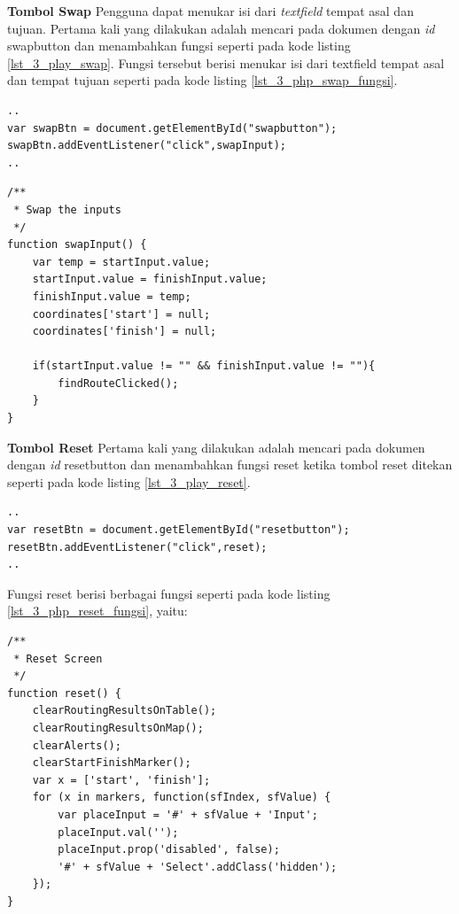 \documentclass[a4paper,twoside]{article}
\begin{document}
\begin{enumerate}
\textbf{Tombol Swap}
Pengguna dapat menukar isi dari \textit{textfield} tempat asal dan tujuan. Pertama kali yang dilakukan adalah mencari pada dokumen dengan \textit{id} swapbutton dan menambahkan fungsi seperti pada kode listing \ref{lst_3_play_swap}. Fungsi tersebut berisi menukar isi dari textfield tempat asal dan tempat tujuan seperti pada kode listing \ref{lst_3_php_swap_fungsi}.
\begin{lstlisting}[caption=\textit{Method} untuk memanggil fungsi JavaScript ketika tombol \textit{swap} ditekan ,label = {lst_3_play_swap}]
..
var swapBtn = document.getElementById("swapbutton");
swapBtn.addEventListener("click",swapInput);
..
\end{lstlisting}
\begin{lstlisting}[caption=Fungsi JavaScript untuk menukar isi \textit{textfield} tempat asal dan tujuan ,label = {lst_3_pplay_swap_fungsi}]	
/**
 * Swap the inputs
 */
function swapInput() {
    var temp = startInput.value;
    startInput.value = finishInput.value;
    finishInput.value = temp;
    coordinates['start'] = null;
    coordinates['finish'] = null;
    
    if(startInput.value != "" && finishInput.value != ""){
        findRouteClicked();
    }
}
\end{lstlisting}

\textbf{Tombol Reset}
Pertama kali yang dilakukan adalah mencari pada dokumen dengan \textit{id} resetbutton dan menambahkan fungsi reset ketika tombol reset ditekan seperti pada kode listing \ref{lst_3_play_reset}. 
\begin{lstlisting}[caption=\textit{Method} untuk memanggil fungsi JavaScript ketika tombol \textit{reset} ditekan ,label = {lst_3_play_reset}]
..
var resetBtn = document.getElementById("resetbutton");
resetBtn.addEventListener("click",reset);
..
\end{lstlisting}
Fungsi reset berisi berbagai fungsi seperti pada kode listing \ref{lst_3_php_reset_fungsi}, yaitu:
\begin{lstlisting}[caption=Fungsi JavaScript reset ,label = {lst_3_play_reset_fungsi}]	
/**
 * Reset Screen
 */
function reset() {
    clearRoutingResultsOnTable();
    clearRoutingResultsOnMap();
    clearAlerts();
    clearStartFinishMarker();
    var x = ['start', 'finish'];
    for (x in markers, function(sfIndex, sfValue) {
        var placeInput = '#' + sfValue + 'Input';
        placeInput.val('');
        placeInput.prop('disabled', false);
        '#' + sfValue + 'Select'.addClass('hidden');
    });
}
\end{lstlisting}


\end{enumerate}
\end{document}
